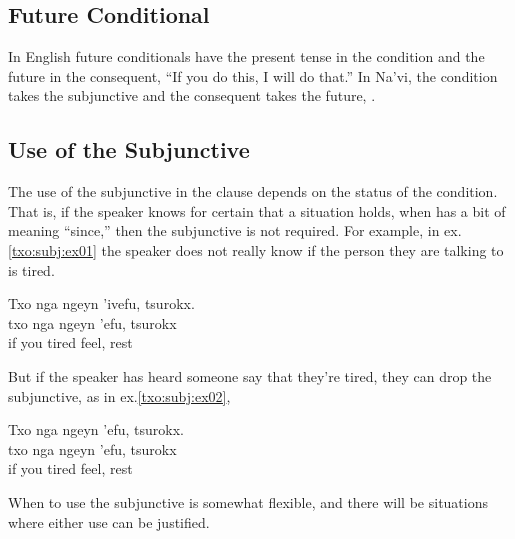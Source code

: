 \subsection{Future Conditional} In English future conditionals have
the present tense in the con\-dition and the future in the consequent,
``If you do this, I will do that.''  In Na'vi, the condition takes the
subjunctive and the consequent takes the future,  . 

\subsection{Use of the Subjunctive} 
The use of the subjunctive in the  clause depends on the status
of the condition.  That is, if the speaker knows for certain that a
situation holds, when  has a bit of meaning ``since,'' then the
subjunctive is not required.  For example, in ex.\ref{txo:subj:ex01}
the speaker does not really know if the person they are talking to is
tired. 

\begin{interlin} \label{txo:subj:ex01}
\glll Txo nga ngeyn 'ivefu, tsurokx. \\
      txo nga ngeyn 'efu, tsurokx \\ 
      if you tired feel, rest \\
\end{interlin}

\noindent But if the speaker has heard someone say that they're tired,
they can drop the subjunctive, as in ex.\ref{txo:subj:ex02},

\begin{interlin} \label{txo:subj:ex02}
\glll Txo nga ngeyn 'efu, tsurokx. \\
      txo nga ngeyn 'efu, tsurokx \\
      if you tired feel, rest \\
\end{interlin}

\noindent When to use the subjunctive is somewhat flexible, and there
will be situations where either use can be justified.

